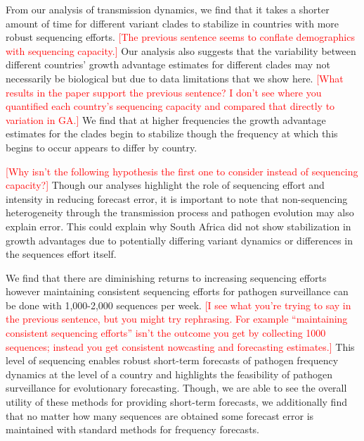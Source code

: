 \documentclass[11pt,oneside,letterpaper]{article}
\def\jhc#1{\textcolor{red}{[#1]}}
\begin{document}
From our analysis of transmission dynamics, we find that it takes a shorter amount of time for different variant clades to stabilize in countries with more robust sequencing efforts.
\jhc{The previous sentence seems to conflate demographics with sequencing capacity.}
Our analysis also suggests that the variability between different countries' growth advantage estimates for different clades may not necessarily be biological but due to data limitations that we show here.
\jhc{What results in the paper support the previous sentence? I don't see where you quantified each country's sequencing capacity and compared that directly to variation in GA.}
We find that at higher frequencies the growth advantage estimates for the clades begin to stabilize though the frequency at which this begins to occur appears to differ by country.


\jhc{Why isn't the following hypothesis the first one to consider instead of sequencing capacity?}
Though our analyses highlight the role of sequencing effort and intensity in reducing forecast error, it is important to note that non-sequencing heterogeneity through the transmission process and pathogen evolution may also explain error.
This could explain why South Africa did not show stabilization in growth advantages due to potentially differing variant dynamics or differences in the sequences effort itself.

We find that there are diminishing returns to increasing sequencing efforts however maintaining consistent sequencing efforts for pathogen surveillance can be done with 1,000-2,000 sequences per week.
\jhc{I see what you're trying to say in the previous sentence, but you might try rephrasing. For example ``maintaining consistent sequencing efforts'' isn't the outcome you get by collecting 1000 sequences; instead you get consistent nowcasting and forecasting estimates.}
This level of sequencing enables robust short-term forecasts of pathogen frequency dynamics at the level of a country and highlights the feasibility of pathogen surveillance for evolutionary forecasting.
Though, we are able to see the overall utility of these methods for providing short-term forecasts, we additionally find that no matter how many sequences are obtained some forecast error is maintained with standard methods for frequency forecasts.
\end{document}
